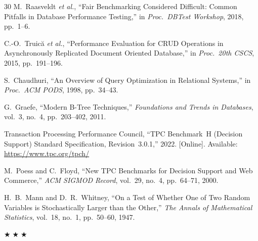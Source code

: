 \documentclass[10pt,a4paper,twocolumn]{article}
\begin{document}
\begin{thebibliography}{30}
M.~Raasveldt \emph{et al.}, ``Fair Benchmarking Considered Difficult: Common Pitfalls in
Database Performance Testing,'' in \emph{Proc.\ DBTest Workshop}, 2018, pp.~1--6.

C.-O.~Truic\u{a} \emph{et al.}, ``Performance Evaluation for CRUD Operations in
Asynchronously Replicated Document Oriented Database,'' in \emph{Proc.\ 20th CSCS},
2015, pp.~191--196.

S.~Chaudhuri, ``An Overview of Query Optimization in Relational Systems,'' in
\emph{Proc.\ ACM PODS}, 1998, pp.~34--43.

G.~Graefe, ``Modern B-Tree Techniques,'' \emph{Foundations and Trends in Databases},
vol.~3, no.~4, pp.~203--402, 2011.

Transaction Processing Performance Council, ``TPC Benchmark~H (Decision Support)
Standard Specification, Revision~3.0.1,'' 2022. [Online]. Available:
\url{https://www.tpc.org/tpch/}

M.~Poess and C.~Floyd, ``New TPC Benchmarks for Decision Support and Web Commerce,''
\emph{ACM SIGMOD Record}, vol.~29, no.~4, pp.~64--71, 2000.

H.~B.~Mann and D.~R.~Whitney, ``On a Test of Whether One of Two Random Variables is
Stochastically Larger than the Other,'' \emph{The Annals of Mathematical Statistics},
vol.~18, no.~1, pp.~50--60, 1947.

\end{thebibliography}

\begin{center}
\vspace{14pt}
$\bigstar\;\bigstar\;\bigstar$
\end{center}

\end{document}
